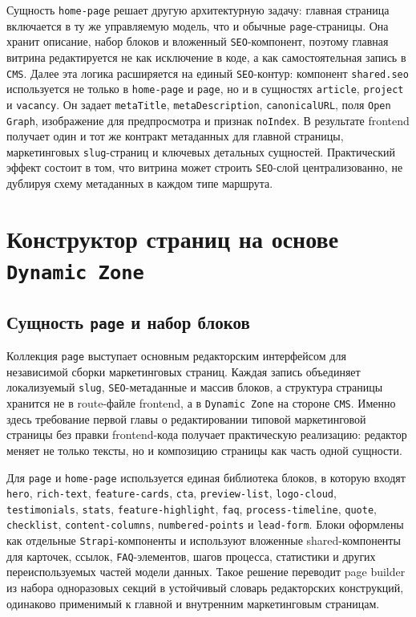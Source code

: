 Сущность \texttt{home-page} решает другую архитектурную задачу: главная страница
включается в ту же управляемую модель, что и обычные \texttt{page}-страницы. Она хранит
описание, набор блоков и вложенный \texttt{SEO}-компонент, поэтому главная витрина
редактируется не как исключение в коде, а как самостоятельная запись в \texttt{CMS}.
Далее эта логика расширяется на единый \texttt{SEO}-контур: компонент
\texttt{shared.seo} используется не только в \texttt{home-page} и \texttt{page}, но и
в сущностях \texttt{article}, \texttt{project} и \texttt{vacancy}. Он задает
\texttt{metaTitle}, \texttt{metaDescription}, \texttt{canonicalURL}, поля
\texttt{Open Graph}, изображение для предпросмотра и признак \texttt{noIndex}. В
результате frontend получает один и тот же контракт метаданных для главной страницы,
маркетинговых \texttt{slug}-страниц и ключевых детальных сущностей. Практический эффект
состоит в том, что витрина может строить \texttt{SEO}-слой централизованно, не
дублируя схему метаданных в каждом типе маршрута.

\section{Конструктор страниц на основе \texttt{Dynamic Zone}}

\subsection{Сущность \texttt{page} и набор блоков}

Коллекция \texttt{page} выступает основным редакторским интерфейсом для независимой
сборки маркетинговых страниц. Каждая запись объединяет локализуемый \texttt{slug},
\texttt{SEO}-метаданные и массив блоков, а структура страницы хранится не в route-файле
frontend, а в \texttt{Dynamic Zone} на стороне \texttt{CMS}. Именно здесь требование
первой главы о редактировании типовой маркетинговой страницы без правки frontend-кода
получает практическую реализацию: редактор меняет не только тексты, но и композицию
страницы как часть одной сущности.

Для \texttt{page} и \texttt{home-page} используется единая библиотека блоков, в которую
входят \texttt{hero}, \texttt{rich-text}, \texttt{feature-cards}, \texttt{cta},
\texttt{preview-list}, \texttt{logo-cloud}, \texttt{testimonials}, \texttt{stats},
\texttt{feature-highlight}, \texttt{faq}, \texttt{process-timeline}, \texttt{quote},
\texttt{checklist}, \texttt{content-columns}, \texttt{numbered-points} и
\texttt{lead-form}. Блоки оформлены как отдельные \texttt{Strapi}-компоненты и
используют вложенные shared-компоненты для карточек, ссылок, \texttt{FAQ}-элементов,
шагов процесса, статистики и других переиспользуемых частей модели данных. Такое
решение переводит page builder из набора одноразовых секций в устойчивый словарь
редакторских конструкций, одинаково применимый к главной и внутренним маркетинговым
страницам.

